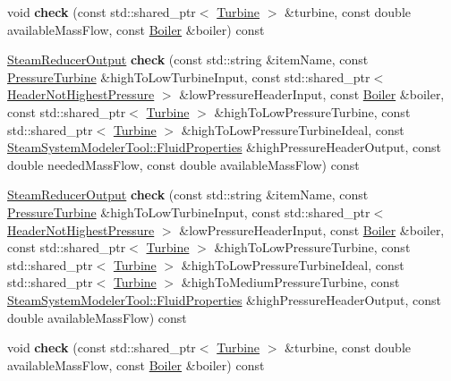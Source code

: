 \begin{DoxyCompactItemize}
\item 
\mbox{\label{class_steam_balance_checker_service_a6d3407ac1df1e18292c5a709c3e2e5c6}} 
void {\bfseries check} (const std\+::shared\+\_\+ptr$<$ \hyperlink{class_turbine}{Turbine} $>$ \&turbine, const double available\+Mass\+Flow, const \hyperlink{class_boiler}{Boiler} \&boiler) const
\item 
\mbox{\label{class_steam_balance_checker_service_a04607d0e0f71f3455f84cfd09d84afe5}} 
\hyperlink{class_steam_reducer_output}{Steam\+Reducer\+Output} {\bfseries check} (const std\+::string \&item\+Name, const \hyperlink{class_pressure_turbine}{Pressure\+Turbine} \&high\+To\+Low\+Turbine\+Input, const std\+::shared\+\_\+ptr$<$ \hyperlink{class_header_not_highest_pressure}{Header\+Not\+Highest\+Pressure} $>$ \&low\+Pressure\+Header\+Input, const \hyperlink{class_boiler}{Boiler} \&boiler, const std\+::shared\+\_\+ptr$<$ \hyperlink{class_turbine}{Turbine} $>$ \&high\+To\+Low\+Pressure\+Turbine, const std\+::shared\+\_\+ptr$<$ \hyperlink{class_turbine}{Turbine} $>$ \&high\+To\+Low\+Pressure\+Turbine\+Ideal, const \hyperlink{struct_steam_system_modeler_tool_1_1_fluid_properties}{Steam\+System\+Modeler\+Tool\+::\+Fluid\+Properties} \&high\+Pressure\+Header\+Output, const double needed\+Mass\+Flow, const double available\+Mass\+Flow) const
\item 
\mbox{\label{class_steam_balance_checker_service_a8b55108b5a59c4512d1bb435ef6dc41d}} 
\hyperlink{class_steam_reducer_output}{Steam\+Reducer\+Output} {\bfseries check} (const std\+::string \&item\+Name, const \hyperlink{class_pressure_turbine}{Pressure\+Turbine} \&high\+To\+Low\+Turbine\+Input, const std\+::shared\+\_\+ptr$<$ \hyperlink{class_header_not_highest_pressure}{Header\+Not\+Highest\+Pressure} $>$ \&low\+Pressure\+Header\+Input, const \hyperlink{class_boiler}{Boiler} \&boiler, const std\+::shared\+\_\+ptr$<$ \hyperlink{class_turbine}{Turbine} $>$ \&high\+To\+Low\+Pressure\+Turbine, const std\+::shared\+\_\+ptr$<$ \hyperlink{class_turbine}{Turbine} $>$ \&high\+To\+Low\+Pressure\+Turbine\+Ideal, const std\+::shared\+\_\+ptr$<$ \hyperlink{class_turbine}{Turbine} $>$ \&high\+To\+Medium\+Pressure\+Turbine, const \hyperlink{struct_steam_system_modeler_tool_1_1_fluid_properties}{Steam\+System\+Modeler\+Tool\+::\+Fluid\+Properties} \&high\+Pressure\+Header\+Output, const double available\+Mass\+Flow) const
\item 
\mbox{\label{class_steam_balance_checker_service_a6d3407ac1df1e18292c5a709c3e2e5c6}} 
void {\bfseries check} (const std\+::shared\+\_\+ptr$<$ \hyperlink{class_turbine}{Turbine} $>$ \&turbine, const double available\+Mass\+Flow, const \hyperlink{class_boiler}{Boiler} \&boiler) const
\end{DoxyCompactItemize}


